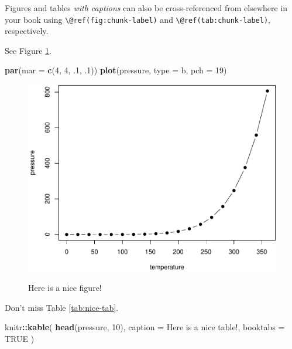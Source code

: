 \documentclass[
]{book}
\newenvironment{Shaded}{\begin{snugshade}}{\end{snugshade}}
\newcommand{\AttributeTok}[1]{\textcolor[rgb]{0.13,0.29,0.53}{#1}}
\newcommand{\ConstantTok}[1]{\textcolor[rgb]{0.56,0.35,0.01}{#1}}
\newcommand{\DecValTok}[1]{\textcolor[rgb]{0.00,0.00,0.81}{#1}}
\newcommand{\FunctionTok}[1]{\textcolor[rgb]{0.13,0.29,0.53}{\textbf{#1}}}
\newcommand{\NormalTok}[1]{#1}
\newcommand{\SpecialCharTok}[1]{\textcolor[rgb]{0.81,0.36,0.00}{\textbf{#1}}}
\newcommand{\StringTok}[1]{\textcolor[rgb]{0.31,0.60,0.02}{#1}}
\theoremstyle{definition}
\theoremstyle{definition}
\theoremstyle{definition}
\theoremstyle{definition}
\theoremstyle{remark}
\begin{document}
Figures and tables \emph{with captions} can also be cross-referenced from elsewhere in your book using \texttt{\textbackslash{}@ref(fig:chunk-label)} and \texttt{\textbackslash{}@ref(tab:chunk-label)}, respectively.

See Figure \ref{fig:nice-fig}.

\begin{Shaded}
\begin{Highlighting}[]
\FunctionTok{par}\NormalTok{(}\AttributeTok{mar =} \FunctionTok{c}\NormalTok{(}\DecValTok{4}\NormalTok{, }\DecValTok{4}\NormalTok{, .}\DecValTok{1}\NormalTok{, .}\DecValTok{1}\NormalTok{))}
\FunctionTok{plot}\NormalTok{(pressure, }\AttributeTok{type =} \StringTok{\textquotesingle{}b\textquotesingle{}}\NormalTok{, }\AttributeTok{pch =} \DecValTok{19}\NormalTok{)}
\end{Highlighting}
\end{Shaded}

\begin{figure}

{\centering \includegraphics[width=0.8\linewidth,alt={Plot with connected points showing that vapor pressure of mercury increases exponentially as temperature increases.}]{2025-GTI-Sem-BancoDeDados_files/figure-latex/nice-fig-1} 

}

\caption{Here is a nice figure!}\label{fig:nice-fig}
\end{figure}

Don't miss Table \ref{tab:nice-tab}.

\begin{Shaded}
\begin{Highlighting}[]
\NormalTok{knitr}\SpecialCharTok{::}\FunctionTok{kable}\NormalTok{(}
  \FunctionTok{head}\NormalTok{(pressure, }\DecValTok{10}\NormalTok{), }\AttributeTok{caption =} \StringTok{\textquotesingle{}Here is a nice table!\textquotesingle{}}\NormalTok{,}
  \AttributeTok{booktabs =} \ConstantTok{TRUE}
\NormalTok{)}
\end{Highlighting}
\end{Shaded}
\end{document}
